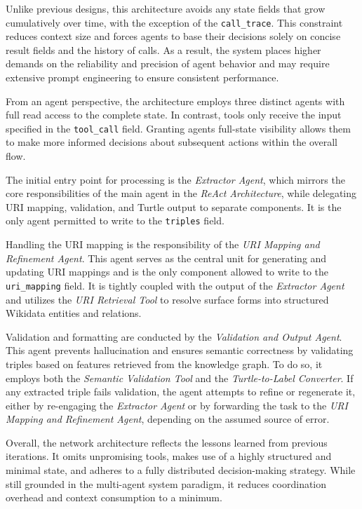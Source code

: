 \documentclass[a4paper,oneside,bibliography=totoc]{scrbook}
\begin{document}
Unlike previous designs, this architecture avoids any state fields that grow cumulatively over time, with the exception of the \texttt{call\_trace}. This constraint reduces context size and forces agents to base their decisions solely on concise result fields and the history of calls. As a result, the system places higher demands on the reliability and precision of agent behavior and may require extensive prompt engineering to ensure consistent performance.

From an agent perspective, the architecture employs three distinct agents with full read access to the complete state. In contrast, tools only receive the input specified in the \texttt{tool\_call} field. Granting agents full-state visibility allows them to make more informed decisions about subsequent actions within the overall flow.

The initial entry point for processing is the \textit{Extractor Agent}, which mirrors the core responsibilities of the main agent in the \textit{ReAct Architecture}, while delegating URI mapping, validation, and Turtle output to separate components. It is the only agent permitted to write to the \texttt{triples} field.

Handling the URI mapping is the responsibility of the \textit{URI Mapping and Refinement Agent}. This agent serves as the central unit for generating and updating URI mappings and is the only component allowed to write to the \texttt{uri\_mapping} field. It is tightly coupled with the output of the \textit{Extractor Agent} and utilizes the \textit{URI Retrieval Tool} to resolve surface forms into structured Wikidata entities and relations.

Validation and formatting are conducted by the \textit{Validation and Output Agent}. This agent prevents hallucination and ensures semantic correctness by validating triples based on features retrieved from the knowledge graph. To do so, it employs both the \textit{Semantic Validation Tool} and the \textit{Turtle-to-Label Converter}. If any extracted triple fails validation, the agent attempts to refine or regenerate it, either by re-engaging the \textit{Extractor Agent} or by forwarding the task to the \textit{URI Mapping and Refinement Agent}, depending on the assumed source of error.

Overall, the network architecture reflects the lessons learned from previous iterations. It omits unpromising tools, makes use of a highly structured and minimal state, and adheres to a fully distributed decision-making strategy. While still grounded in the multi-agent system paradigm, it reduces coordination overhead and context consumption to a minimum.
\end{document}

